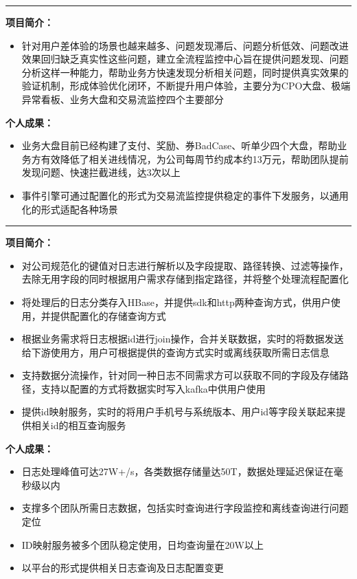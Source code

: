 \documentclass{resume}
\begin{document}
\rule{\textwidth}{0.1mm}
\textbf{项目简介：}
\begin{itemize}
  \item 针对用户差体验的场景也越来越多、问题发现滞后、问题分析低效、问题改进效果回归缺乏真实性这些问题，建立全流程监控中心旨在提供问题发现、问题分析这样一种能力，帮助业务方快速发现分析相关问题，同时提供真实效果的验证机制，形成体验优化闭环，不断提升用户体验，主要分为CPO大盘、极端异常看板、业务大盘和交易流监控四个主要部分
\end{itemize}
\textbf{个人成果：}
\begin{itemize}
  \item 业务大盘目前已经构建了支付、奖励、券BadCase、听单少四个大盘，帮助业务方有效降低了相关进线情况，为公司每周节约成本约13万元，帮助团队提前发现问题、快速拦截进线，达3次以上
  \item 事件引擎可通过配置化的形式为交易流监控提供稳定的事件下发服务，以通用化的形式适配各种场景
\end{itemize}

\rule{\textwidth}{0.1mm}
\textbf{项目简介：}
\begin{itemize}
  \item 对公司规范化的键值对日志进行解析以及字段提取、路径转换、过滤等操作，去除无用字段的同时根据用户需求存储到指定路径，并将整个处理流程配置化
  \item 将处理后的日志分类存入HBase，并提供sdk和http两种查询方式，供用户使用，并提供配置化的存储查询方式
  \item 根据业务需求将日志根据id进行join操作，合并关联数据，实时的将数据发送给下游使用方，用户可根据提供的查询方式实时或离线获取所需日志信息
  \item 支持数据分流操作，针对同一种日志不同需求方可以获取不同的字段及存储路径，支持以配置的方式将数据实时写入kafka中供用户使用
  \item 提供id映射服务，实时的将用户手机号与系统版本、用户id等字段关联起来提供相关id的相互查询服务
\end{itemize}
\textbf{个人成果：}
\begin{itemize}
  \item 日志处理峰值可达27W+/s，各类数据存储量达50T，数据处理延迟保证在毫秒级以内
  \item 支撑多个团队所需日志数据，包括实时查询进行字段监控和离线查询进行问题定位
  \item ID映射服务被多个团队稳定使用，日均查询量在20W以上
  \item 以平台的形式提供相关日志查询及日志配置变更
\end{itemize}
\end{document}
